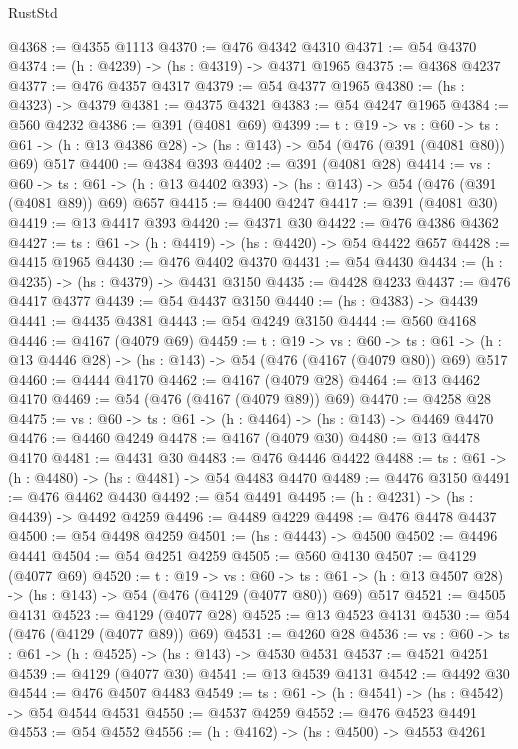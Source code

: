 \begin{lexlean}{RustStd}
\begin{coremodule}
@4368 := @4355 @1113
@4370 := @476 @4342 @4310
@4371 := @54 @4370
@4374 := (h : @4239) -> (hs : @4319) -> @4371 @1965
@4375 := @4368 @4237
@4377 := @476 @4357 @4317
@4379 := @54 @4377 @1965
@4380 := (hs : @4323) -> @4379
@4381 := @4375 @4321
@4383 := @54 @4247 @1965
@4384 := @560 @4232
@4386 := @391 (@4081 @69)
@4399 := {t : @19} ->
  {vs : @60} ->
  {ts : @61} -> (h : @13 @4386 @28) -> (hs : @143) -> @54 (@476 (@391 (@4081 @80)) @69) @517
@4400 := @4384 @393
@4402 := @391 (@4081 @28)
@4414 := {vs : @60} ->
  {ts : @61} -> (h : @13 @4402 @393) -> (hs : @143) -> @54 (@476 (@391 (@4081 @89)) @69) @657
@4415 := @4400 @4247
@4417 := @391 (@4081 @30)
@4419 := @13 @4417 @393
@4420 := @4371 @30
@4422 := @476 @4386 @4362
@4427 := {ts : @61} -> (h : @4419) -> (hs : @4420) -> @54 @4422 @657
@4428 := @4415 @1965
@4430 := @476 @4402 @4370
@4431 := @54 @4430
@4434 := (h : @4235) -> (hs : @4379) -> @4431 @3150
@4435 := @4428 @4233
@4437 := @476 @4417 @4377
@4439 := @54 @4437 @3150
@4440 := (hs : @4383) -> @4439
@4441 := @4435 @4381
@4443 := @54 @4249 @3150
@4444 := @560 @4168
@4446 := @4167 (@4079 @69)
@4459 := {t : @19} ->
  {vs : @60} ->
  {ts : @61} -> (h : @13 @4446 @28) -> (hs : @143) -> @54 (@476 (@4167 (@4079 @80)) @69) @517
@4460 := @4444 @4170
@4462 := @4167 (@4079 @28)
@4464 := @13 @4462 @4170
@4469 := @54 (@476 (@4167 (@4079 @89)) @69)
@4470 := @4258 @28
@4475 := {vs : @60} -> {ts : @61} -> (h : @4464) -> (hs : @143) -> @4469 @4470
@4476 := @4460 @4249
@4478 := @4167 (@4079 @30)
@4480 := @13 @4478 @4170
@4481 := @4431 @30
@4483 := @476 @4446 @4422
@4488 := {ts : @61} -> (h : @4480) -> (hs : @4481) -> @54 @4483 @4470
@4489 := @4476 @3150
@4491 := @476 @4462 @4430
@4492 := @54 @4491
@4495 := (h : @4231) -> (hs : @4439) -> @4492 @4259
@4496 := @4489 @4229
@4498 := @476 @4478 @4437
@4500 := @54 @4498 @4259
@4501 := (hs : @4443) -> @4500
@4502 := @4496 @4441
@4504 := @54 @4251 @4259
@4505 := @560 @4130
@4507 := @4129 (@4077 @69)
@4520 := {t : @19} ->
  {vs : @60} ->
  {ts : @61} -> (h : @13 @4507 @28) -> (hs : @143) -> @54 (@476 (@4129 (@4077 @80)) @69) @517
@4521 := @4505 @4131
@4523 := @4129 (@4077 @28)
@4525 := @13 @4523 @4131
@4530 := @54 (@476 (@4129 (@4077 @89)) @69)
@4531 := @4260 @28
@4536 := {vs : @60} -> {ts : @61} -> (h : @4525) -> (hs : @143) -> @4530 @4531
@4537 := @4521 @4251
@4539 := @4129 (@4077 @30)
@4541 := @13 @4539 @4131
@4542 := @4492 @30
@4544 := @476 @4507 @4483
@4549 := {ts : @61} -> (h : @4541) -> (hs : @4542) -> @54 @4544 @4531
@4550 := @4537 @4259
@4552 := @476 @4523 @4491
@4553 := @54 @4552
@4556 := (h : @4162) -> (hs : @4500) -> @4553 @4261

\end{coremodule}
\end{lexlean}

